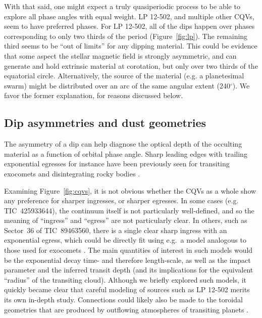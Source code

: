 \documentclass[11pt,twocolumn,tighten]{aastex63}
\begin{document}
With that said, one might expect a truly quasiperiodic process to be
able to explore all phase angles with equal weight.  LP 12-502, and
multiple other CQVs, seem to have preferred phases.  For LP 12-502,
all of the dips happen over phases corresponding to only two thirds of
the period (Figure~\ref{fig:lp}).  The remaining third seems to be
``out of limits'' for any dipping material.  This could be evidence
that some aspect the stellar magnetic field is strongly asymmetric,
and can generate and hold extrinsic material at corotation, but only
over two thirds of the equatorial circle.  Alternatively, the source
of the material (e.g. a planetesimal swarm) might be distributed over
an arc of the same angular extent (240$^\circ$).  We favor the former
explanation, for reasons discussed below.

\subsection{Dip asymmetries and dust geometries}
The asymmetry of a dip can help diagnose the optical depth of the
occulting material as a function of orbital phase angle.  Sharp
leading edges with trailing exponential egresses for instance have
been previously seen for transiting exocomets and disintegrating rocky
bodies
\citep[e.g.][]{2012ApJ...752....1R,2012A&A...545L...5B,2015Natur.526..546V,2019A&A...625L..13Z}.

Examining Figure~\ref{fig:cqvs}, it is not obvious whether the CQVs as
a whole show any preference for sharper ingresses, or sharper
egresses.  In some cases (e.g. TIC~425933644), the continuum itself is
not particularly well-defined, and so the meaning of ``ingress'' and
``egress'' are not particularly clear.  In others, such as Sector~36
of TIC~89463560, there is a single clear sharp ingress with an
exponential egress, which could be directly fit using e.g.~a model
analogous to those used for exocomets
\citep[e.g.][]{2019A&A...625L..13Z}.  The main quantities of interest
in such models would be the exponential decay time- and therefore
length-scale, as well as the impact parameter and the inferred transit
depth (and its implications for the equivalent ``radius'' of the
transiting cloud).  Although we briefly explored such models, it
quickly became clear that careful modeling of sources such as LP
12-502 merits its own in-depth study.  Connections could likely also
be made to the toroidal geometries that are produced by outflowing
atmospheres of transiting planets
\citep[e.g.][]{2019ApJ...873...89M,2022ApJ...926..226M}.
\end{document}
